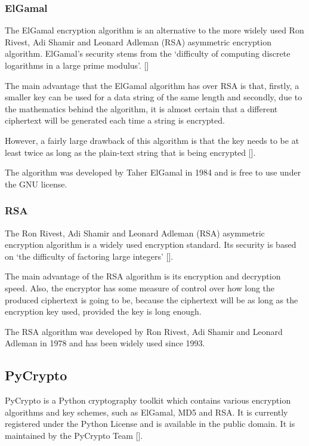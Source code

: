 \subsubsection{ElGamal}
\label{sec:elgamal}

The ElGamal encryption algorithm is an alternative to the more widely used  Ron Rivest, Adi
Shamir and Leonard Adleman (RSA) asymmetric encryption algorithm. ElGamal's security stems
from the `difficulty of computing discrete logarithms in a large prime modulus'.
[\cite{website:elgamal}]

The main advantage that the ElGamal algorithm has over RSA is that, firstly, a smaller key can
be used for a data string of the same length and secondly, due to the mathematics behind the
algorithm, it is almost certain that a different ciphertext will be generated each time a
string is encrypted.

However, a fairly large drawback of this algorithm is that the key needs to be at least twice
as long as the plain-text string that is being encrypted
[\cite{journal:elgamal}].

The algorithm was developed by Taher ElGamal in 1984 and is free to use under the GNU license.

\subsubsection{RSA}
\label{sec:rsa}

The Ron Rivest, Adi Shamir and Leonard Adleman (RSA) asymmetric encryption algorithm is a
widely used encryption standard. Its security is based on `the difficulty of factoring large 
integers' [\cite{website:elgamal}]. 

The main advantage of the RSA algorithm is its encryption and decryption speed. Also, the
encryptor has some measure of control over how long the produced ciphertext is going to be,
because the ciphertext will be as long as the encryption key used, provided the key is long
enough.

The RSA algorithm was developed by Ron Rivest, Adi Shamir and Leonard Adleman in 1978 and has
been widely used since 1993. 

\subsection{PyCrypto}

PyCrypto is a Python cryptography toolkit which contains various encryption algorithms and
key schemes, such as ElGamal, MD5 and RSA. It is currently registered under the
Python License and is available in the public domain. It is maintained by the
PyCrypto Team [\cite{website:pycrypto}].

